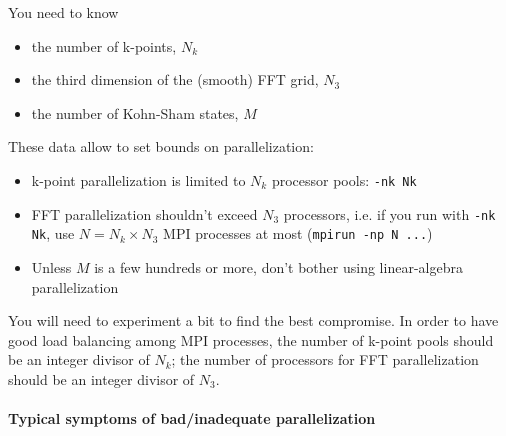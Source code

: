 \documentclass[12pt,a4paper]{article}
\begin{document}
You need to know
\begin{itemize}
\item 
  the number of k-points, $N_k$
\item
  the third dimension of the (smooth) FFT grid, $N_3$
\item
  the number of Kohn-Sham states, $M$
\end{itemize}
These data allow to set bounds on parallelization:
\begin{itemize}
\item 
  k-point parallelization is limited to $N_k$ processor pools: 
  \texttt{-nk Nk}
\item
  FFT parallelization shouldn't exceed $N_3$ processors, i.e. if you
  run with \texttt{-nk Nk}, use $N=N_k\times N_3$ MPI processes at most (\texttt{mpirun -np N ...})
\item
  Unless $M$ is a few hundreds or more, don't bother using linear-algebra
  parallelization
\end{itemize}
You will need to experiment a bit to find the best compromise. In order
to have good load balancing among MPI processes, the number of k-point
pools should be an integer divisor of $N_k$; the number of processors for
FFT parallelization should be an integer divisor of $N_3$. 

\paragraph{Typical symptoms of bad/inadequate parallelization}
\end{document}
